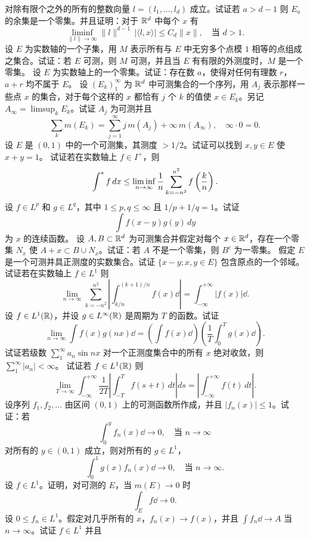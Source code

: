 \begin{enumerate}[label=\textbf{\arabic*.},itemsep=.8em]
对除有限个之外的所有的整数向量 $l=(l_1,\ldots,l_d)$ 成立。试证若 $a>d-1$ 则 $E_a$ 的余集是一个零集。并且证明：对于 $\mathbb R^d$ 中每个 $x$ 有
\[\liminf_{\|l\|\to\infty}\|l\|^{d-1}\,|\langle l,x\rangle|\le C_d\|x\|,\quad\text{当 }d>1.\]
 设 $E$ 为实数轴的一个子集，用 $M$ 表示所有与 $E$ 中无穷多个点模 $1$ 相等的点组成之集合。试证：若 $E$ 可测，则 $M$ 可测，并且当 $E$ 有有限的外测度时，$M$ 是一个零集。
 设 $E$ 为实数轴上的一个零集。试证：存在数 $a$，使得对任何有理数 $r$，$a+r$ 均不属于 $E$。
 设 $(E_k)_1^\infty$ 为 $\mathbb R^d$ 中可测集合的一个序列，用 $A_j$ 表示那样一些点 $x$ 的集合，对于每个这样的 $x$ 都恰有 $j$ 个 $k$ 的值使 $x\in E_k$。另记 $A_\infty=\limsup_k E_k$。试证 $A_j$ 为可测并且
\[\sum_k m(E_k)=\sum_{j=1}^\infty j\,m(A_j)+\infty\,m(A_\infty),\quad\infty\cdot0=0.\]
 设 $E$ 是 $(0,1)$ 中的一个可测集，其测度 $>1/2$。试证可以找到 $x,y\in E$ 使 $x+y=1$。
 试证若在实数轴上 $f\in I^+$，则
\[\int^{*} f\,dx\le\liminf_{n\to\infty}\frac1n\sum_{k=-n^2}^{n^2}f\left(\frac kn\right).\]
 设 $f\in L^p$ 和 $g\in L^q$，其中 $1\le p,q\le\infty$ 且 $1/p+1/q=1$。试证
\[\int f(x-y)g(y)\,dy\]
为 $x$ 的连续函数。
 设 $A,B\subset\mathbb R^d$ 为可测集合并假定对每个 $x\in\mathbb R^d$，存在一个零集 $N_x$ 使 $A+x\subset B\cup N_x$。试证：若 $A$ 不是一个零集，则 $B^c$ 为一零集。
 假定 $E$ 是一个可测并具正测度的实数集合。试证 $\{x-y;x,y\in E\}$ 包含原点的一个邻域。
 试证若在实数轴上 $f\in L^1$ 则
\[\lim_{n\to\infty}\sum_{k=-n^2}^{n^2}\left|\int_{k/n}^{(k+1)/n}f(x)\dd\right|=\int_{-\infty}^{+\infty}|f(x)|\dd.\]
 设 $f\in L^1(\mathbb R)$，并设 $g\in L^\infty(\mathbb R)$ 是周期为 $T$ 的函数。试证
\[\lim_{n\to\infty}\int f(x)g(nx)\dd=\left(\int f(x)\dd\right)\left(\frac1T\int_0^Tg(x)\dd\right).\]
 试证若级数 $\sum_1^\infty a_n\sin nx$ 对一个正测度集合中的所有 $x$ 绝对收敛，则 $\sum_1^\infty|a_n|<\infty$。
 试证若 $f\in L^1(\mathbb R)$ 则
\[\lim_{T\to\infty}\int_{-\infty}^{+\infty}\frac1{2T}\left|\int_{-T}^Tf(s+t)\,dt\right|ds=\left|\int_{-\infty}^{+\infty}f(t)\,dt\right|.\]
 设序列 $f_1,f_2,\ldots$ 由区间 $(0,1)$ 上的可测函数所作成，并且
$|f_n(x)|\le1$。试证：若
\[\int_0^y f_n(x)\dd\to0,\quad\text{当 }n\to\infty\]
对所有的 $y\in(0,1)$ 成立，则对所有的 $g\in L^1$，
\[\int_0^1 g(x)f_n(x)\dd\to0,\quad\text{当 }n\to\infty.\]
 设 $f\in L^1$。证明，对可测的 $E$，当 $m(E)\to0$ 时
\[\int_E f\dd\to0.\]
 设 $0\le f_n\in L^1$。假定对几乎所有的 $x$，$f_n(x)\to f(x)$，并且 $\int f_n\dd\to A$ 当 $n\to\infty$。试证 $f\in L^1$ 并且

\end{enumerate}
